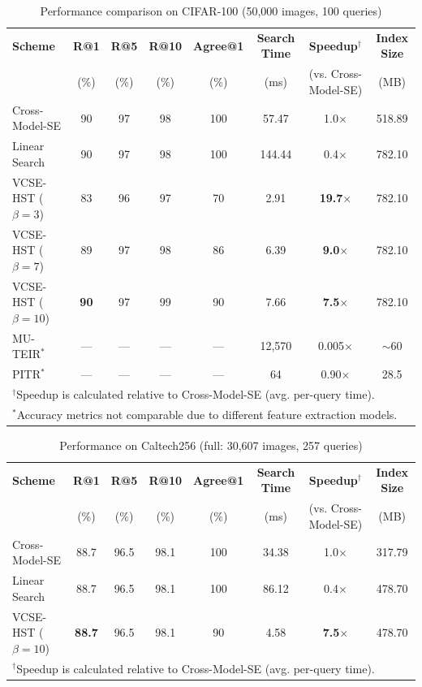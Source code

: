 \documentclass[journal]{IEEEtran}
\begin{document}
\begin{table}[!t]
\centering
\caption{Performance comparison on CIFAR-100 (50{,}000 images, 100 queries)}
\label{tab:comparison_cifar_full}
\begin{tabular}{lccccccc}
\toprule
\textbf{Scheme} & \textbf{R@1} & \textbf{R@5} & \textbf{R@10} & \textbf{Agree@1} & \textbf{Search Time} & \textbf{Speedup}$^\dagger$ & \textbf{Index Size} \\
 & (\%) & (\%) & (\%) & (\%) & (ms) & (vs. Cross-Model-SE) & (MB) \\
\midrule
Cross-Model-SE & 90 & 97 & 98 & 100 & 57.47 & 1.0$\times$ & 518.89 \\
Linear Search & 90 & 97 & 98 & 100 & 144.44 & 0.4$\times$ & 782.10 \\
\midrule
VCSE-HST ($\beta=3$) & 83 & 96 & 97 & 70 & 2.91 & \textbf{19.7$\times$} & 782.10 \\
VCSE-HST ($\beta=7$) & 89 & 97 & 98 & 86 & 6.39 & \textbf{9.0$\times$} & 782.10 \\
VCSE-HST ($\beta=10$) & \textbf{90} & 97 & 99 & 90 & 7.66 & \textbf{7.5$\times$} & 782.10 \\
\midrule
MU-TEIR$^*$ & --- & --- & --- & --- & 12{,}570 & 0.005$\times$ & $\sim$60 \\
PITR$^*$ & --- & --- & --- & --- & 64 & 0.90$\times$ & 28.5 \\
\bottomrule
\multicolumn{8}{l}{\footnotesize $^\dagger$Speedup is calculated relative to Cross-Model-SE (avg. per-query time).} \\
\multicolumn{8}{l}{\footnotesize $^*$Accuracy metrics not comparable due to different feature extraction models.} \\
\end{tabular}
\end{table}

\begin{table}[!t]
\centering
\caption{Performance on Caltech256 (full: 30{,}607 images, 257 queries)}
\label{tab:comparison_caltech_full}
\begin{tabular}{lccccccc}
\toprule
\textbf{Scheme} & \textbf{R@1} & \textbf{R@5} & \textbf{R@10} & \textbf{Agree@1} & \textbf{Search Time} & \textbf{Speedup}$^\dagger$ & \textbf{Index Size} \\
 & (\%) & (\%) & (\%) & (\%) & (ms) & (vs. Cross-Model-SE) & (MB) \\
\midrule
Cross-Model-SE & 88.7 & 96.5 & 98.1 & 100 & 34.38 & 1.0$\times$ & 317.79 \\
Linear Search & 88.7 & 96.5 & 98.1 & 100 & 86.12 & 0.4$\times$ & 478.70 \\
\midrule
VCSE-HST ($\beta=10$) & \textbf{88.7} & 96.5 & 98.1 & 90 & 4.58 & \textbf{7.5$\times$} & 478.70 \\
\bottomrule
\multicolumn{8}{l}{\footnotesize $^\dagger$Speedup is calculated relative to Cross-Model-SE (avg. per-query time).} \\
\end{tabular}
\end{table}
\end{document}
